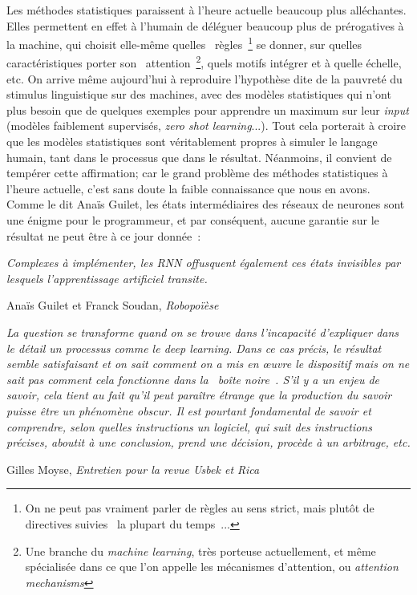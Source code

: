 \documentclass{article}
\newenvironment{citationbox}
{\begin{center}
		\begin{minipage}{.8\textwidth}
		}
		{
		\end{minipage}	
\end{center}
}
\begin{document}
			Les méthodes statistiques paraissent à l'heure actuelle beaucoup plus alléchantes. Elles permettent en effet à l'humain de déléguer beaucoup plus de prérogatives à la machine, qui choisit elle-même quelles \guillemotleft~règles~\guillemotright\footnote{On ne peut pas vraiment parler de règles au sens strict, mais plutôt de directives suivies \guillemotleft~la plupart du temps~\guillemotright...} se donner, sur quelles caractéristiques porter son \guillemotleft~attention~\guillemotright\footnote{Une branche du \textit{machine learning}, très porteuse actuellement, et même spécialisée dans ce que l'on appelle les mécanismes d'attention, ou \textit{attention mechanisms}}, quels motifs intégrer et à quelle échelle, etc. On arrive même aujourd'hui à reproduire l'hypothèse dite de la pauvreté du stimulus linguistique sur des machines, avec des modèles statistiques qui n'ont plus besoin que de quelques exemples pour apprendre un maximum sur leur \textit{input} (modèles faiblement supervisés, \textit{zero shot learning}...). Tout cela porterait à croire que les modèles statistiques sont véritablement propres à simuler le langage humain, tant dans le processus que dans le résultat. Néanmoins, il convient de tempérer cette affirmation; car le grand problème des méthodes statistiques à l'heure actuelle, c'est sans doute la faible connaissance que nous en avons. Comme le dit Anaïs Guilet, les états intermédiaires des réseaux de neurones sont une énigme pour le programmeur, et par conséquent, aucune garantie sur le résultat ne peut être à ce jour donnée~:
			\begin{citationbox}
				\textit{Complexes à implémenter, les RNN offusquent également ces états invisibles par lesquels l'apprentissage artificiel transite.}
				\begin{flushright}
					Anaïs Guilet et Franck Soudan, \textit{Robopoïèse} \autocite{guilet2017}
				\end{flushright}
			\end{citationbox}
			\begin{citationbox}
				\textit{La question se transforme quand on se trouve dans l’incapacité d’expliquer dans le détail un processus comme le deep learning. Dans ce cas précis, le résultat semble satisfaisant et on sait comment on a mis en œuvre le dispositif mais on ne sait pas comment cela fonctionne dans la \guillemotleft~boîte noire~\guillemotright. S’il y a un enjeu de savoir, cela tient au fait qu’il peut paraître étrange que la production du savoir puisse être un phénomène obscur. Il est pourtant fondamental de savoir et comprendre, selon quelles instructions un logiciel, qui suit des instructions précises, aboutit à une conclusion, prend une décision, procède à un arbitrage, etc.}
				\begin{flushright}
					Gilles Moyse, \textit{Entretien pour la revue Usbek et Rica} \autocite{edin2018}
				\end{flushright}
			\end{citationbox}
\end{document}
